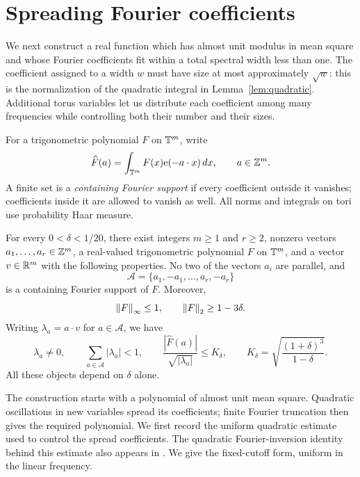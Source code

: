 \section{Spreading Fourier coefficients}
\label{sec:spreading}

We next construct a real function which has almost unit modulus in mean
square and whose Fourier coefficients fit within a total spectral width
less than one.  The coefficient assigned to a width $w$ must have size at
most approximately $\sqrt w$: this is the normalization of the quadratic
integral in Lemma~\ref{lem:quadratic}.  Additional torus variables let us
distribute each coefficient among many frequencies while controlling
both their number and their sizes.

For a trigonometric polynomial $F$ on $\mathbb T^m$, write
\[
 \widehat F(a)=\int_{\mathbb T^m}F(x)\mathrm e(-a\cdot x)\,dx,
 \qquad a\in\mathbb Z^m.
\]
A finite set is a \emph{containing Fourier support} if every coefficient
outside it vanishes; coefficients inside it are allowed to vanish as well.
All norms and integrals on tori use probability Haar measure.

\begin{proposition}
\label{prop:auxiliary}
For every $0<\delta<1/20$, there exist integers $m\ge1$ and $r\ge2$,
nonzero vectors $a_1,\ldots,a_r\in\mathbb Z^m$, a real-valued trigonometric
polynomial $F$ on $\mathbb T^m$, and a vector $v\in\mathbb R^m$ with the following
properties.  No two of the vectors $a_i$ are parallel, and
\[
 \mathcal A=\{a_1,-a_1,\ldots,a_r,-a_r\}
\]
is a containing Fourier support of $F$.  Moreover,
\begin{equation}
 \label{eq:auxiliary-norms}
 \left\lVert F\right\rVert_\infty\le1,
 \qquad \left\lVert F\right\rVert_2\ge1-3\delta.
\end{equation}
Writing $\lambda_a=a\cdot v$ for $a\in\mathcal A$, we have
\begin{equation}
 \label{eq:auxiliary-widths}
 \lambda_a\ne0,
 \qquad \sum_{a\in\mathcal A}|\lambda_a|<1,
 \qquad
 \frac{|\widehat F(a)|}{\sqrt{|\lambda_a|}}
 \le K_\delta,
 \qquad
 K_\delta=\sqrt{\frac{(1+\delta)^3}{1-\delta}}.
\end{equation}
All these objects depend on $\delta$ alone.
\end{proposition}

The construction starts with a polynomial of almost unit mean square.
Quadratic oscillations in new variables spread its coefficients; finite
Fourier truncation then gives the required polynomial.  We first record
the uniform quadratic estimate used to control the spread coefficients.
The quadratic Fourier-inversion identity behind this estimate also
appears in \cite[Section~2, Equation~(2.2)]{BombieriBourgain2009}.
We give the fixed-cutoff form, uniform in the linear frequency.

